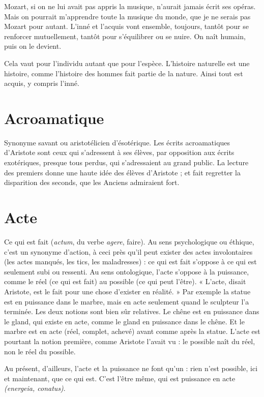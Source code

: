 Mozart, si on ne lui avait pas appris la musique, n'aurait jamais écrit ses
opéras. Mais on pourrait m’apprendre toute la musique du monde, que je ne
serais pas Mozart pour autant. L’inné et l’acquis vont ensemble, toujours,
tantôt pour se renforcer mutuellement, tantôt pour s’équilibrer ou se nuire. On
naît humain, puis on le devient.

Cela vaut pour l'individu autant que pour l’espèce. L'histoire naturelle est
une histoire, comme l’histoire des hommes fait partie de la nature. Ainsi tout
est acquis, y compris l’inné.

\section{Acroamatique}
Synonyme savant ou aristotélicien d’ésotérique. Les écrits
acroamatiques d’Aristote sont ceux qui s'adressent à ses
élèves, par opposition aux écrits exotériques, presque tous perdus, qui s’adressaient
au grand public. La lecture des premiers donne une haute idée des élèves
d’Aristote ; et fait regretter la disparition des seconds, que les Anciens admiraient
fort.

\section{Acte}
Ce qui est fait ({\it actum}, du verbe {\it agere}, faire). Au sens psychologique
ou éthique, c’est un synonyme d’action, à ceci près qu’il peut exister
des actes involontaires (les actes manqués, les tics, les maladresses) : ce qui est
fait s’oppose à ce qui est seulement subi ou ressenti. Au sens ontologique, l’acte
s'oppose à la puissance, comme le réel (ce qui est fait) au possible (ce qui peut
l'être). « L'acte, disait Aristote, est le fait pour une chose d'exister en réalité. »
Par exemple la statue est en puissance dans le marbre, mais en acte seulement
quand le sculpteur l’a terminée.
Les deux notions sont bien sûr relatives. Le chêne est en puissance dans le
gland, qui existe en acte, comme le gland en puissance dans le chêne. Et le
marbre est en acte (réel, complet, achevé) avant comme après la statue. L'acte
est pourtant la notion première, comme Aristote l’avait vu : le possible naît du
réel, non le réel du possible.

Au présent, d’ailleurs, l’acte et la puissance ne font qu’un : rien n’est possible,
ici et maintenant, que ce qui est. C’est l'être même, qui est puissance en
acte {\it (energeia, conatus)}.

